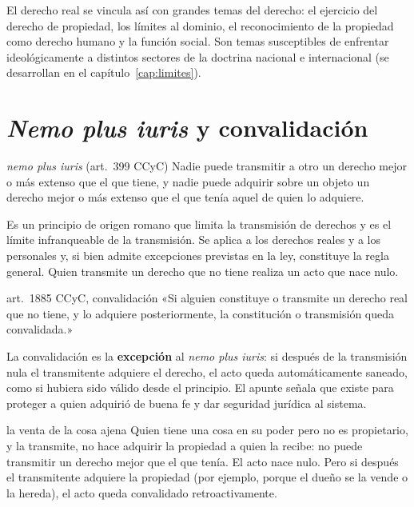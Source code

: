 \documentclass[12pt,oneside]{book}
\begin{document}
El derecho real se vincula así con grandes temas del derecho: el ejercicio del derecho de propiedad, los límites al dominio, el reconocimiento de la propiedad como derecho humano y la función social. Son temas susceptibles de enfrentar ideológicamente a distintos sectores de la doctrina nacional e internacional (se desarrollan en el capítulo~\ref{cap:limites}).

\section{\textit{Nemo plus iuris} y convalidación}

\begin{definicion}{\textit{nemo plus iuris} (art.~399 CCyC)}
Nadie puede transmitir a otro un derecho mejor o más extenso que el que tiene, y nadie puede adquirir sobre un objeto un derecho mejor o más extenso que el que tenía aquel de quien lo adquiere.
\end{definicion}

Es un principio de origen romano que limita la transmisión de derechos y es el límite infranqueable de la transmisión. Se aplica a los derechos reales y a los personales y, si bien admite excepciones previstas en la ley, constituye la regla general. Quien transmite un derecho que no tiene realiza un acto que nace nulo.

\begin{regla}{art.~1885 CCyC, convalidación}
«Si alguien constituye o transmite un derecho real que no tiene, y lo adquiere posteriormente, la constitución o transmisión queda convalidada.»
\end{regla}

La convalidación es la \textbf{excepción} al \textit{nemo plus iuris}: si después de la transmisión nula el transmitente adquiere el derecho, el acto queda automáticamente saneado, como si hubiera sido válido desde el principio. El apunte señala que existe para proteger a quien adquirió de buena fe y dar seguridad jurídica al sistema.

\begin{ejemplo}{la venta de la cosa ajena}
Quien tiene una cosa en su poder pero no es propietario, y la transmite, no hace adquirir la propiedad a quien la recibe: no puede transmitir un derecho mejor que el que tenía. El acto nace nulo. Pero si después el transmitente adquiere la propiedad (por ejemplo, porque el dueño se la vende o la hereda), el acto queda convalidado retroactivamente.
\end{ejemplo}
\end{document}
